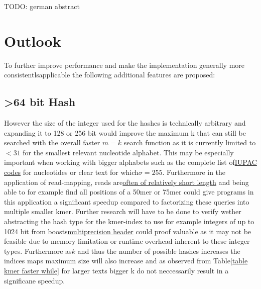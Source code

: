 \begin{abstractDE}
TODO: german abstract
\end{abstractDE}
\vfill

\tableofcontents{}
\setcounter{page}{1}








\chapter{Outlook}

To further improve performance and make the implementation generally
more consistentlsapplicable the following additional features are
proposed:

\section{>64 bit Hash}


However the size of the integer used for the hashes is technically arbitrary and
expanding it to 128 or 256 bit would improve the maximum k that can
still be searched with the overall faster $m=k$ search function as
it is currently limited to$<31$ for the smallest relevant nucleotide
alphabet. This may be especially important when working with bigger
alphabets such as the complete list of\href{https://www.bioinformatics.org/sms/iupac.html}{IUPAC codes}
for nucleotides or clear text for which$\sigma=255$. Furthermore
in the application of read-mapping, reads are\href{https://www.illumina.com/science/technology/next-generation-sequencing/plan-experiments/read-length.html}{often of relatively short length}
and being able to for example find all positions of a 50mer or 75mer
could give programs in this application a significant speedup compared
to factorizing these queries into multiple smaller kmer. Further research
will have to be done to verify wether abstracting the hash type for
the kmer-index to use for example integers of up to 1024 bit from
boosts\href{https://www.boost.org/doc/libs/1_62_0/libs/multiprecision/doc/html/boost_multiprecision/tut/ints/cpp_int.html}{multiprecision header}
could proof valuable as it may not be feasible due to memory limitation
or runtime overhead inherent to these integer types. Furthermore as$k$
and thus the number of possible hashes increases the indices maps
maximum size will also increase and as observed from Table\ref{table kmer faster while}
for larger texts bigger k do not neccessarily result in a significane
speedup.

